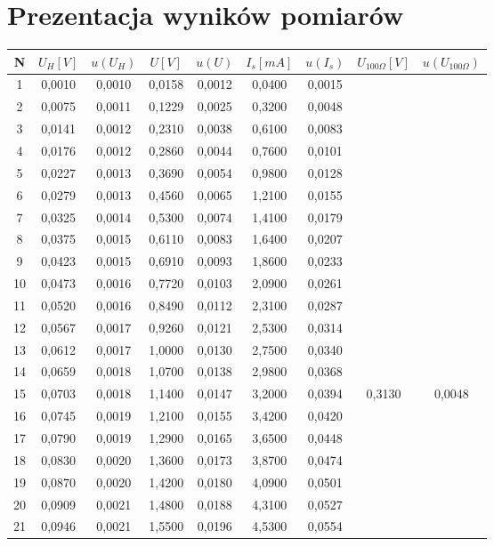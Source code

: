\documentclass[10pt,a4paper]{article}
\begin{document}
\section{Prezentacja wyników pomiarów}
\hfill
\begin{tabular}{c|c|c|c|c|c|c|c|c}
N	&	$U_H [V]$	&	$u(U_H)$	&	$U[V]$	&	$u(U)$	&	 $I_s[mA]$	&	$u(I_s)$	&	 $U_{100\Omega}[V]$	&	$u(U_{100\Omega})$	 \\\hline
1	&	0,0010	&	0,0010	&	0,0158	&	0,0012	&	0,0400	&	0,0015	&		&		\\
2	&	0,0075	&	0,0011	&	0,1229	&	0,0025	&	0,3200	&	0,0048	&		&		\\
3	&	0,0141	&	0,0012	&	0,2310	&	0,0038	&	0,6100	&	0,0083	&		&		\\
4	&	0,0176	&	0,0012	&	0,2860	&	0,0044	&	0,7600	&	0,0101	&		&		\\
5	&	0,0227	&	0,0013	&	0,3690	&	0,0054	&	0,9800	&	0,0128	&		&		\\
6	&	0,0279	&	0,0013	&	0,4560	&	0,0065	&	1,2100	&	0,0155	&		&		\\
7	&	0,0325	&	0,0014	&	0,5300	&	0,0074	&	1,4100	&	0,0179	&		&		\\
8	&	0,0375	&	0,0015	&	0,6110	&	0,0083	&	1,6400	&	0,0207	&		&		\\
9	&	0,0423	&	0,0015	&	0,6910	&	0,0093	&	1,8600	&	0,0233	&		&		\\
10	&	0,0473	&	0,0016	&	0,7720	&	0,0103	&	2,0900	&	0,0261	&		&		\\
11	&	0,0520	&	0,0016	&	0,8490	&	0,0112	&	2,3100	&	0,0287	&		&		\\
12	&	0,0567	&	0,0017	&	0,9260	&	0,0121	&	2,5300	&	0,0314	&		&		\\
13	&	0,0612	&	0,0017	&	1,0000	&	0,0130	&	2,7500	&	0,0340	&		&		\\
14	&	0,0659	&	0,0018	&	1,0700	&	0,0138	&	2,9800	&	0,0368	&		&		\\
15	&	0,0703	&	0,0018	&	1,1400	&	0,0147	&	3,2000	&	0,0394	&	0,3130	&	0,0048	\\
16	&	0,0745	&	0,0019	&	1,2100	&	0,0155	&	3,4200	&	0,0420	&		&		\\
17	&	0,0790	&	0,0019	&	1,2900	&	0,0165	&	3,6500	&	0,0448	&		&		\\
18	&	0,0830	&	0,0020	&	1,3600	&	0,0173	&	3,8700	&	0,0474	&		&		\\
19	&	0,0870	&	0,0020	&	1,4200	&	0,0180	&	4,0900	&	0,0501	&		&		\\
20	&	0,0909	&	0,0021	&	1,4800	&	0,0188	&	4,3100	&	0,0527	&		&		\\
21	&	0,0946	&	0,0021	&	1,5500	&	0,0196	&	4,5300	&	0,0554	&		&		\\

\end{tabular}
\end{document}
